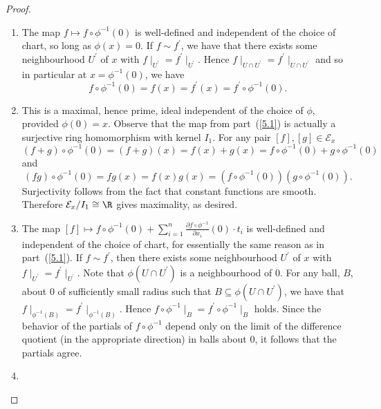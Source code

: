 \documentclass[10pt]{amsart}
\begin{document}
\begin{thm}
  \begin{proof}
    \begin{enumerate}
    \item
      The map $f \mapsto f \circ \phi^{-1}(0)$ is well-defined and independent of the choice of chart, so long as $\phi(x) = 0$.
      If $f \sim f^\prime$, we have that there exists some neighbourhood $U^\prime$ of $x$ with $f\mid_{U^\prime} = f^\prime\mid_{U^\prime}$.
      Hence $f\mid_{U \cap U^\prime} = f^\prime\mid_{U \cap U^\prime}$ and so in particular at $x = \phi^{-1}(0)$, we have
      $$f \circ \phi^{-1}(0) = f(x) = f^\prime(x) = f^\prime \circ \phi^{-1}(0).$$
    \item
      This is a maximal, hence prime, ideal independent of the choice of $\phi$, provided $\phi(0) = x$.
      Observe that the map from part~(\ref{5.1}) is actually a surjective ring homomorphism with kernel $I_1$.
      For any pair $[f], [g] \in \mathcal{E}_x$
      $$(f + g)\circ \phi^{-1}(0) = (f + g)(x) = f(x) + g(x) = f \circ \phi^{-1}(0) + g \circ \phi^{-1}(0)$$
      and 
      $$(fg) \circ \phi^{-1}(0) = fg(x) = f(x)g(x) = (f \circ \phi^{-1}(0))(g \circ \phi^{-1}(0)).$$
      Surjectivity follows from the fact that constant functions are smooth.
      Therefore $\mathcal{E}_x / I_1 \cong \R$ gives maximality, as desired.
    \item
      The map $[f] \mapsto f\circ \phi^{-1}(0) + \sum_{i=1}^n \frac{\partial f \circ \phi^{-1}}{\partial x_i}(0) \cdot t_i$ is well-defined and independent of the choice of chart, for essentially the same reason as in part~(\ref{5.1}).
      If $f \sim f^\prime$, then there exists some neighbourhood $U^\prime$ of $x$ with $f\mid_{U^\prime} = f^\prime\mid_{U^\prime}$.
      Note that $\phi(U \cap U^\prime)$ is a neighbourhood of $0$.
      For any ball, $B$, about $0$ of sufficiently small radius such that $B \subseteq \phi(U \cap U^\prime)$, we have that $f\mid_{\phi^{-1}(B)} = f^\prime\mid_{\phi^{-1}(B)}$.
      Hence $f\circ\phi^{-1}\mid_B = f^\prime\circ\phi^{-1}\mid_B$ holds. 
      Since the behavior of the partials of $f \circ \phi^{-1}$ depend only on the limit of the difference quotient (in the appropriate direction) in balls about $0$, it follows that the partials agree.
    \item

\end{enumerate}
\end{proof}
\end{thm}
\end{document}
